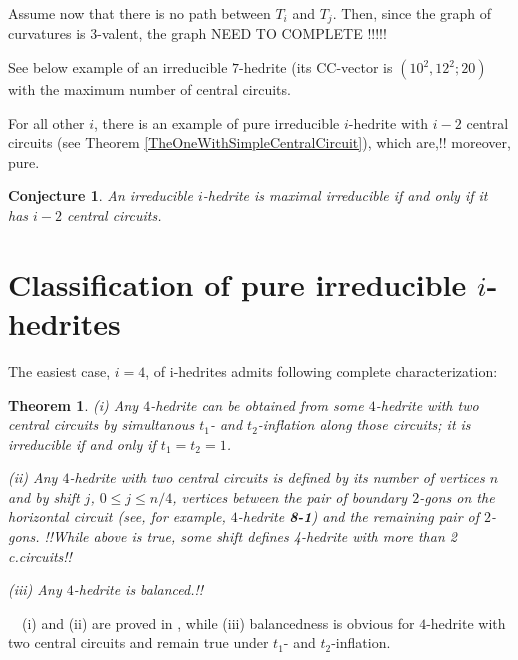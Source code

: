 \documentclass[12pt]{article}
\newtheorem{theorem}{Theorem}
\newtheorem{conjecture}{Conjecture}
\newcommand{\proof}{\noindent{\bf Proof.}\ \ }
\begin{document}
Assume now that there is no path between $T_i$ and $T_j$. Then, since the graph of curvatures is $3$-valent, the graph NEED TO COMPLETE
!!!!!












See below example of an irreducible $7$-hedrite (its CC-vector is $(10^2, 12^2; 20)$ with the maximum number of central circuits.


\begin{center}
\epsfxsize=60mm
\end{center}

For all other $i$, there is an example of pure irreducible $i$-hedrite with $i-2$ central circuits (see 
Theorem \ref{TheOneWithSimpleCentralCircuit}), which are,!! moreover, pure.















\begin{conjecture}
An irreducible $i$-hedrite is maximal irreducible if and only if it has $i-2$ central circuits.
\end{conjecture}



\section{Classification of pure irreducible $i$-hedrites}
The easiest case, $i=4$, of i-hedrites admits following complete
characterization:

\begin{theorem}\label{Theorem-for-4-hedrite}
(i) Any $4$-hedrite can be obtained from some $4$-hedrite with two central
circuits by simultanous $t_1$- and $t_2$-inflation along those circuits; it is
irreducible if and only if $t_1=t_2=1$.

(ii) Any $4$-hedrite with two central circuits is defined by
its number of vertices $n$ and by {\em shift} $j$, $0 \le j \le n/4$,
vertices between the pair of boundary $2$-gons on the horizontal
circuit (see, for example, $4$-hedrite {\bf 8-1}) and the remaining
pair of $2$-gons.
!!While above is true, some shift defines 4-hedrite with more than
2 c.circuits!!

(iii) Any $4$-hedrite is balanced.!!

\end{theorem}
\proof (i) and (ii) are proved in \cite{DSt}, while (iii) balancedness
is obvious for $4$-hedrite with two central circuits and remain true
under $t_1$- and $t_2$-inflation.
\end{document}
